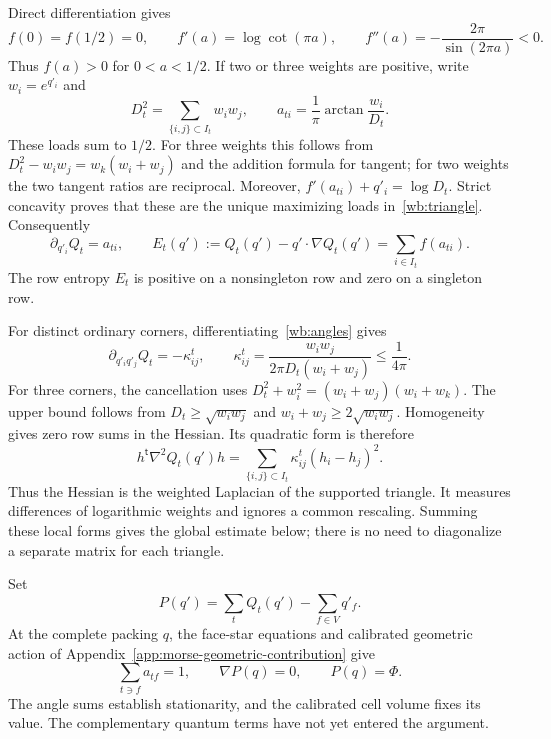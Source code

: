 Direct differentiation gives
\[
 f(0)=f(1/2)=0,\qquad f'(a)=\log\cot(\pi a),\qquad
 f''(a)=-\frac{2\pi}{\sin(2\pi a)}<0.
\]
Thus $f(a)>0$ for $0<a<1/2$. If two or three weights are positive,
write $w_i=e^{q'_i}$ and
\begin{equation}\label{wb:angles}
 D_t^2=\sum_{\{i,j\}\subset I_t}w_iw_j,
 \qquad a_{ti}=\frac1\pi\arctan\frac{w_i}{D_t}.
\end{equation}
These loads sum to $1/2$. For three weights this follows from
$D_t^2-w_iw_j=w_k(w_i+w_j)$ and the addition formula for tangent;
for two weights the two tangent ratios are reciprocal. Moreover,
$f'(a_{ti})+q'_i=\log D_t$. Strict concavity proves that these are
the unique maximizing loads in~\eqref{wb:triangle}. Consequently
\[
 \partial_{q'_i}Q_t=a_{ti},\qquad
 E_t(q'):=Q_t(q')-q'\cdot\nabla Q_t(q')
        =\sum_{i\in I_t}f(a_{ti}).
\]
The row entropy $E_t$ is positive on a nonsingleton row and zero on
a singleton row.

For distinct ordinary corners, differentiating~\eqref{wb:angles} gives
\begin{equation}\label{wb:hessian}
 \partial_{q'_iq'_j}Q_t=-\kappa_{ij}^t,
 \qquad
 \kappa_{ij}^t=\frac{w_iw_j}{2\pi D_t(w_i+w_j)}
                    \le\frac1{4\pi}.
\end{equation}
For three corners, the cancellation uses
$D_t^2+w_i^2=(w_i+w_j)(w_i+w_k)$. The upper bound follows from
$D_t\ge\sqrt{w_iw_j}$ and $w_i+w_j\ge2\sqrt{w_iw_j}$.
Homogeneity gives zero row sums in the Hessian. Its quadratic form is
therefore
\[
 h^{\mathsf t}\nabla^2Q_t(q')h
       =\sum_{\{i,j\}\subset I_t}\kappa_{ij}^t(h_i-h_j)^2.
\]
Thus the Hessian is the weighted Laplacian of the supported triangle.
It measures differences of logarithmic weights and ignores a common
rescaling. Summing these local forms gives the global estimate below;
there is no need to diagonalize a separate matrix for each triangle.

Set
\begin{equation}\label{wb:action}
 P(q')=\sum_tQ_t(q')-\sum_{f\in V}q'_f.
\end{equation}
At the complete packing $q$, the face-star equations and calibrated
geometric action of Appendix~\ref{app:morse-geometric-contribution} give
\begin{equation}\label{wb:stationary}
 \sum_{t\ni f}a_{tf}=1,\qquad \nabla P(q)=0,
 \qquad P(q)=\Phi.
\end{equation}
The angle sums establish stationarity, and the calibrated cell volume
fixes its value. The complementary quantum terms have not yet entered
the argument.


